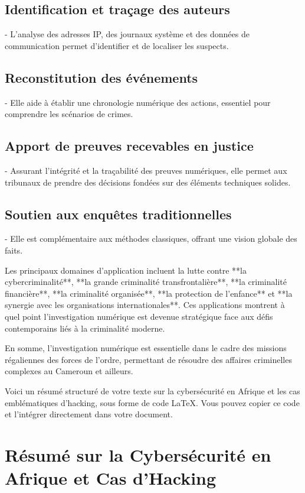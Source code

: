 \documentclass[12pt,a4paper]{article}
\begin{document}
\subsection{Identification et traçage des auteurs}
- L’analyse des adresses IP, des journaux système et des données de communication permet d'identifier et de localiser les suspects.

\subsection{Reconstitution des événements}
- Elle aide à établir une chronologie numérique des actions, essentiel pour comprendre les scénarios de crimes.

\subsection{Apport de preuves recevables en justice}
- Assurant l’intégrité et la traçabilité des preuves numériques, elle permet aux tribunaux de prendre des décisions fondées sur des éléments techniques solides.

\subsection{Soutien aux enquêtes traditionnelles}
- Elle est complémentaire aux méthodes classiques, offrant une vision globale des faits.

Les principaux domaines d’application incluent la lutte contre **la cybercriminalité**, **la grande criminalité transfrontalière**, **la criminalité financière**, **la criminalité organisée**, **la protection de l’enfance** et **la synergie avec les organisations internationales**. Ces applications montrent à quel point l’investigation numérique est devenue stratégique face aux défis contemporains liés à la criminalité moderne.

En somme, l'investigation numérique est essentielle dans le cadre des missions régaliennes des forces de l'ordre, permettant de résoudre des affaires criminelles complexes au Cameroun et ailleurs.

Voici un résumé structuré de votre texte sur la cybersécurité en Afrique et les cas emblématiques d’hacking, sous forme de code LaTeX. Vous pouvez copier ce code et l’intégrer directement dans votre document.

\section{Résumé sur la Cybersécurité en Afrique et Cas d'Hacking}
\end{document}
